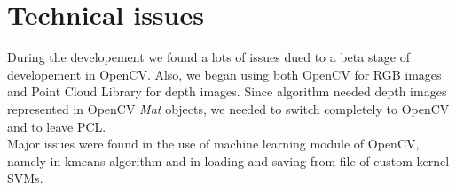 \documentclass{article}
\begin{document}
\section{Technical issues}
During the developement we found a lots of issues dued to a beta stage of
developement in OpenCV. Also, we began using both OpenCV for RGB images and
Point Cloud Library for depth images. Since algorithm \citep{Fanelli2011}
needed depth images represented in OpenCV \textit{Mat} objects, we needed to
switch completely to OpenCV and to leave PCL.
\\
Major issues were found in the use of machine learning module of OpenCV, namely
in kmeans algorithm and in loading and saving from file of custom kernel SVMs.

\printbibliography
\end{document}
